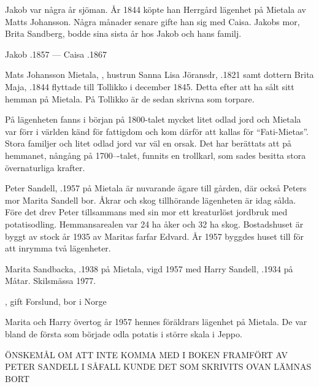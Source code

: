 Jakob var några år sjöman. År 1844 köpte han Herrgård lägenhet på Mietala av Matts Johansson. Några månader senare gifte han sig med Caisa. Jakobs mor, Brita Sandberg, bodde sina sista år hos Jakob och hans familj.

Jakob .1857  ---  Caisa .1867


Mats Johansson Mietala, , hustrun Sanna Lisa Jöransdr, .1821 samt dottern Brita Maja,  .1844 flyttade till Tollikko i december 1845. Detta efter att ha sålt sitt hemman på Mietala. På Tollikko är de sedan skrivna som torpare.

På lägenheten fanns i början på 1800-talet mycket litet odlad jord och Mietala var förr i världen känd för fattigdom och kom därför att kallas för ``Fati-Mietas''. Stora familjer och litet odlad jord var väl en orsak. Det har berättats att på hemmanet, nångång på 1700---talet, funnits en trollkarl, som sades besitta stora övernaturliga krafter.






Peter Sandell, .1957 på Mietala är nuvarande ägare till gården, där också Peters mor Marita Sandell bor. Åkrar och skog tillhörande lägenheten är idag sålda. Före det drev Peter tillsammans med sin mor ett kreaturlöst jordbruk med potatisodling. Hemmansarealen var 24 ha åker och 32 ha skog. Bostadshuset är byggt av stock år 1935 av Maritas farfar Edvard. År 1957 byggdes huset till för att inrymma två lägenheter.


Marita  Sandbacka, .1938 på Mietala, vigd 1957 med Harry Sandell, .1934 på Måtar. Skilsmässa 1977.
\begin{jhchildren}
  \item {}
  \item {}, gift Forslund, bor i Norge
\end{jhchildren}
Marita och Harry övertog år 1957 hennes föräldrars lägenhet på Mietala. De var bland de första som började odla potatis i större skala i Jeppo.

ÖNSKEMÅL OM ATT INTE KOMMA MED I BOKEN FRAMFÖRT AV PETER SANDELL I SÅFALL KUNDE  DET SOM SKRIVITS OVAN LÄMNAS BORT


